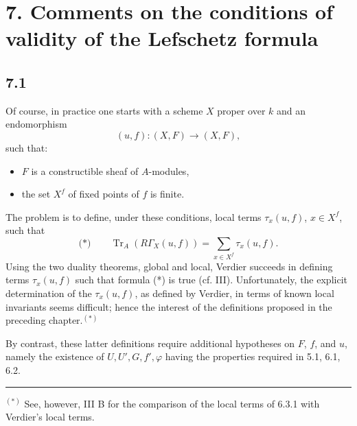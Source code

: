 \documentclass[11pt]{article}
\providecommand{\Tr}{\operatorname{Tr}}
\providecommand{\Tr}{\operatorname{Tr}}
\providecommand{\Tr}{\operatorname{Tr}}
\providecommand{\Tr}{\operatorname{Tr}}
\providecommand{\Tr}{\operatorname{Tr}}
\begin{document}
\section*{7. Comments on the conditions of validity of the Lefschetz formula}

\subsection*{7.1}
Of course, in practice one starts with a scheme $X$ proper over $k$ and an endomorphism
\[
(u,f):(X,F)\longrightarrow (X,F),
\]
such that:
\begin{itemize}
\item $F$ is a constructible sheaf of $A$-modules,
\item the set $X^f$ of fixed points of $f$ is finite.
\end{itemize}
The problem is to define, under these conditions, local terms $\tau_x(u,f)$, $x\in X^f$, such that
\[
\text{(*)}\qquad \Tr_A(R\Gamma_X(u,f))=\sum_{x\in X^f}\tau_x(u,f).
\]
Using the two duality theorems, global and local, Verdier succeeds in defining terms $\tau_x(u,f)$ such that formula (*) is true (cf. III). Unfortunately, the explicit determination of the $\tau_x(u,f)$, as defined by Verdier, in terms of known local invariants seems difficult; hence the interest of the definitions proposed in the preceding chapter.$^{(*)}$

By contrast, these latter definitions require additional hypotheses on $F$, $f$, and $u$, namely the existence of $U,U',G,f',\varphi$ having the properties required in 5.1, 6.1, 6.2.

\bigskip
\noindent
\rule{6cm}{0.4pt}

$^{(*)}$ See, however, III B for the comparison of the local terms of 6.3.1 with Verdier's local terms.
\end{document}
